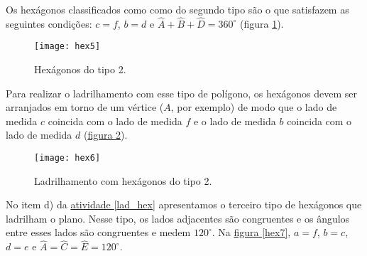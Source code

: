 Os hexágonos classificados como  como do segundo tipo são o que satisfazem as seguintes condições: $c= f$, $b=d$ e  $\hat{A} + \hat{B} + \hat{D} = 360^{\circ}$ (figura \ref{hex5}).

\begin{figure}[H]
\centering
\texttt{[image: hex5]}
\caption{Hexágonos do tipo 2.}
\label{hex5}
\end{figure}


Para realizar o ladrilhamento com esse tipo de polígono, os hexágonos devem ser arranjados em torno de um vértice ($A$, por exemplo)  de modo que o lado de medida $c$ coincida com o lado de medida $f$ e o lado de medida $b$ coincida com o lado de medida $d$ (\hyperref[hex6]{figura \ref{hex6}}).

\begin{figure}[H]
\centering
\texttt{[image: hex6]}
\caption{Ladrilhamento com hexágonos do tipo 2.}
\label{hex6}
\end{figure}

No item d) da \hyperref[lad_hex]{atividade \ref{lad_hex}} apresentamos o terceiro tipo de hexágonos que ladrilham o plano. Nesse tipo, os lados adjacentes são congruentes e os ângulos entre esses lados são congruentes e medem $120^{\circ}$. Na \hyperref[hex7]{figura \ref{hex7}}, $a=f$, $b=c$, $d=e$ e $\hat{A}=\hat{C}=\hat{E}= 120^{\circ}$.

\clearmargin

